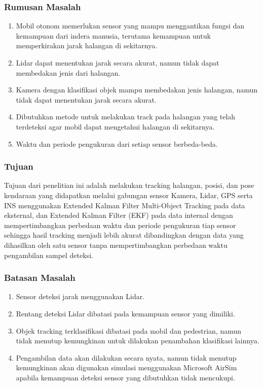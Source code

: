 \begin{frame}
    \frametitle{Rumusan Masalah}
    \begin{enumerate}
        \item Mobil otonom memerlukan sensor yang mampu menggantikan fungsi dan kemampuan dari indera manusia, terutama kemampuan untuk memperkirakan jarak halangan di sekitarnya.
        \item Lidar dapat menentukan jarak secara akurat, namun tidak dapat membedakan jenis dari halangan.
        \item Kamera dengan klasifikasi objek mampu membedakan jenis halangan, namun tidak dapat menentukan jarak secara akurat.
        \item Dibutuhkan metode untuk melakukan track pada halangan yang telah terdeteksi agar mobil dapat mengetahui halangan di sekitarnya.
        \item Waktu dan periode pengukuran dari setiap sensor berbeda-beda.
    \end{enumerate}
\end{frame}


\begin{frame}
    \frametitle{Tujuan}
    \justifying
    Tujuan dari penelitian ini adalah melakukan tracking halangan, posisi, dan pose kendaraan yang didapatkan melalui gabungan sensor Kamera, Lidar, GPS serta INS menggunakan Extended Kalman Filter Multi-Object Tracking pada data eksternal, dan Extended Kalman Filter (EKF) pada data internal dengan mempertimbangkan perbedaan waktu dan periode pengukuran tiap sensor sehingga hasil tracking menjadi lebih akurat dibandingkan dengan data yang dihasilkan oleh satu sensor tanpa mempertimbangkan perbedaan waktu pengambilan sampel deteksi.
\end{frame}


\begin{frame}
    \frametitle{Batasan Masalah}
    \justifying
    \begin{enumerate}
        \justifying
        \item Sensor deteksi jarak menggunakan Lidar.
        \item Rentang deteksi Lidar dibatasi pada kemampuan sensor yang dimiliki.
        \item Objek tracking terklasifikasi dibatasi pada mobil dan pedestrian, namun tidak menutup kemungkinan untuk dilakukan penambahan klasifikasi lainnya.
        \item Pengambilan data akan dilakukan secara nyata, namun tidak menutup kemungkinan akan digunakan simulasi menggunakan Microsoft AirSim apabila kemampuan deteksi sensor yang dibutuhkan tidak mencukupi.
    \end{enumerate}
\end{frame}


